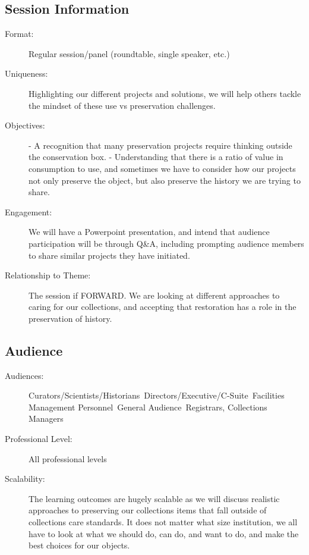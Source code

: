 \documentclass{report}
\begin{document}
              \subsection*{Session Information}
                \begin{description}
                  \item [Format:] Regular session/panel (roundtable, single speaker, etc.)
							    
							    \item [Uniqueness:]Highlighting our different projects and solutions, we will help others tackle the mindset of these use vs preservation challenges.
							    \item [Objectives:]- A recognition that many preservation projects require thinking outside the conservation box.
- Understanding that there is a ratio of value in consumption to use, and sometimes we have to consider how our projects not only preserve the object, but also preserve the history we are trying to share.
							    \item [Engagement:]We will have a Powerpoint presentation, and intend that audience participation will be through Q\&A, including prompting audience members to share similar projects they have initiated.
							    \item [Relationship to Theme:]The session if FORWARD. We are looking at different approaches to caring for our collections, and accepting that restoration has a role in the preservation of history.
							    
                \end{description}
              \subsection*{Audience}
                \begin{description}
                  \item [Audiences:]Curators/Scientists/Historians~Directors/Executive/C-Suite~Facilities Management Personnel~General Audience~Registrars, Collections Managers~
                  \item[Professional Level:]All professional levels~
                \item[Scalability:] The learning outcomes are hugely scalable as we will discuss realistic approaches to preserving our collections items that fall outside of collections care standards. It does not matter what size institution, we all have to look at what we should do, can do, and want to do, and make the best choices for our objects.	

							
              \end{description}
\end{document}
